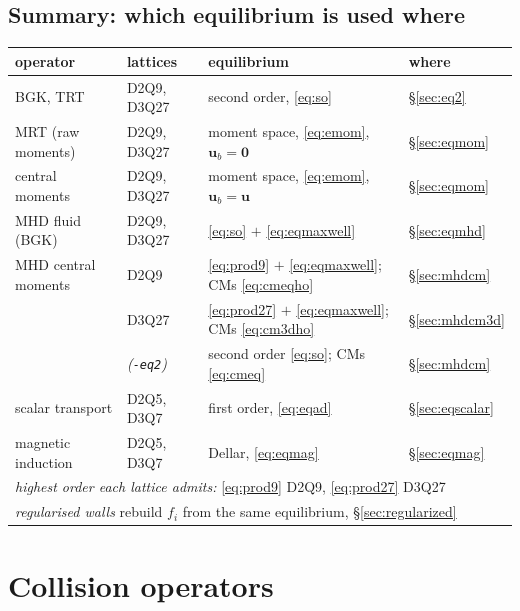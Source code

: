 \documentclass[11pt,a4paper]{article}
\newcommand{\code}[1]{\texttt{\small #1}}
\newcommand{\uu}{\bm{u}}
\begin{document}
\subsection{Summary: which equilibrium is used where}
\label{sec:eqsummary}

\begin{center}\small
\begin{tabular}{llll}
\toprule
operator & lattices & equilibrium & where \\
\midrule
BGK, TRT            & D2Q9, D3Q27 & second order, \eqref{eq:so} & \S\ref{sec:eq2} \\
MRT (raw moments)   & D2Q9, D3Q27 & moment space, \eqref{eq:emom}, $\uu_b=\bm0$ & \S\ref{sec:eqmom} \\
central moments     & D2Q9, D3Q27 & moment space, \eqref{eq:emom}, $\uu_b=\uu$ & \S\ref{sec:eqmom} \\
MHD fluid (BGK)     & D2Q9, D3Q27 & \eqref{eq:so} $+$ \eqref{eq:eqmaxwell} & \S\ref{sec:eqmhd} \\
MHD central moments & D2Q9               & \eqref{eq:prod9} $+$ \eqref{eq:eqmaxwell}; CMs \eqref{eq:cmeqho} & \S\ref{sec:mhdcm} \\
                    & D3Q27              & \eqref{eq:prod27} $+$ \eqref{eq:eqmaxwell}; CMs \eqref{eq:cm3dho} & \S\ref{sec:mhdcm3d} \\
                    & \emph{(\code{-eq2})} & second order \eqref{eq:so}; CMs \eqref{eq:cmeq} & \S\ref{sec:mhdcm} \\
scalar transport    & D2Q5, D3Q7         & first order, \eqref{eq:eqad} & \S\ref{sec:eqscalar} \\
magnetic induction  & D2Q5, D3Q7         & Dellar, \eqref{eq:eqmag} & \S\ref{sec:eqmag} \\
\midrule
\multicolumn{4}{l}{\emph{highest order each lattice admits:} \eqref{eq:prod9} D2Q9, \eqref{eq:prod27} D3Q27} \\
\multicolumn{4}{l}{\emph{regularised walls} rebuild $f_i$ from the same equilibrium, \S\ref{sec:regularized}} \\
\bottomrule
\end{tabular}
\end{center}

\section{Collision operators}
\end{document}
